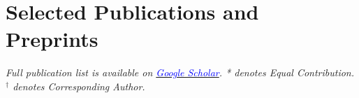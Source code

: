 \documentclass[letterpaper,11pt]{article}
\newcommand{\resumeSubHeadingListStart}{\begin{itemize}[leftmargin=0.0in, label={}]}
\newcommand{\resumeSubHeadingListEnd}{\end{itemize}}
\begin{document}

\section{Selected Publications and Preprints}
\small{\textit{Full publication list is available on \href{https://scholar.google.com/citations?user=qG5_O40AAAAJ&hl=zh-CN}{\textcolor{blue}{Google Scholar}}. * denotes Equal Contribution. $^\dagger$ denotes Corresponding Author.}}
\end{document}
